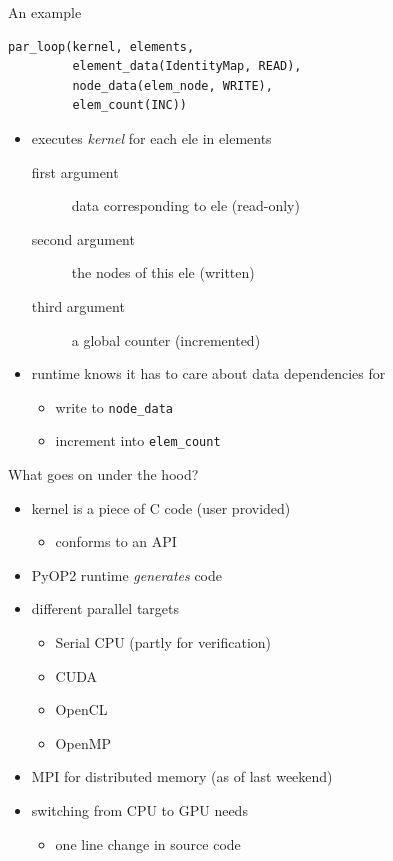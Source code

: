 \documentclass[bigger]{beamer}
\begin{document}
\begin{frame}[fragile,label={sec:orgheadline13}]{An example}
 \begin{verbatim}
par_loop(kernel, elements,
         element_data(IdentityMap, READ),
         node_data(elem_node, WRITE),
         elem_count(INC))
\end{verbatim}

\begin{itemize}
\item executes \emph{kernel} for each ele in elements
\begin{description}
\item[{first argument}] data corresponding to ele (read-only)
\item[{second argument}] the nodes of this ele (written)
\item[{third argument}] a global counter (incremented)
\end{description}

\item runtime knows it has to care about data dependencies for
\begin{itemize}
\item write to \verb~node_data~
\item increment into \verb~elem_count~
\end{itemize}
\end{itemize}
\end{frame}

\begin{frame}[label={sec:orgheadline14}]{What goes on under the hood?}
\begin{itemize}
\item kernel is a piece of C code (user provided)
\begin{itemize}
\item conforms to an API
\end{itemize}
\item PyOP2 runtime \emph{generates} code
\item different parallel targets
\begin{itemize}
\item Serial CPU (partly for verification)
\item CUDA
\item OpenCL
\item OpenMP
\end{itemize}
\item MPI for distributed memory (as of last weekend)
\item switching from CPU to GPU needs
\begin{itemize}
\item one line change in source code
\end{itemize}
\end{itemize}
\end{frame}
\end{document}
